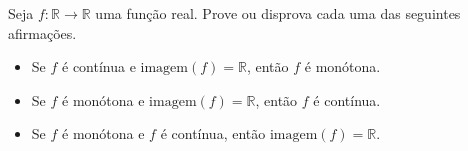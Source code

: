 Seja \(f \colon \mathbb{R} \to \mathbb{R}\) uma função real. Prove ou disprova cada uma das seguintes afirmações.\begin{itemize}

\item[(a)] Se \(f\) é contínua e \(\text{imagem}(f)=\mathbb{R}\), então \(f\) é monótona.
\item[(b)] Se \(f\) é monótona e \(\text{imagem}(f)=\mathbb{R}\), então \(f\) é contínua.
\item[(c)] Se \(f\) é monótona e \(f\) é contínua, então \(\text{imagem}(f)=\mathbb{R}\).
\end{itemize}
